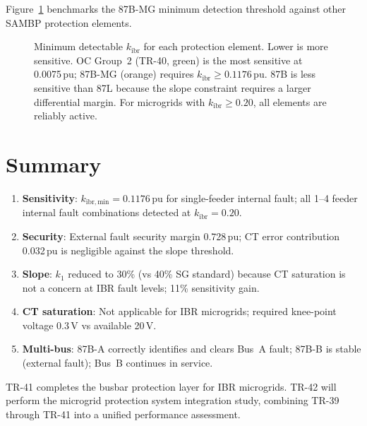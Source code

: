 \documentclass[11pt,a4paper]{article}
\begin{document}
Figure~\ref{fig:sensitivity} benchmarks the 87B-MG minimum detection threshold
against other SAMBP protection elements.

\begin{figure}[htbp]
  \centering
  \resizebox{0.88\textwidth}{!}{}
  \caption{Minimum detectable $k_\mathrm{ibr}$ for each protection element.
           Lower is more sensitive.  OC Group~2 (TR-40, green) is the
           most sensitive at 0.0075\,pu; 87B-MG (orange) requires
           $k_\mathrm{ibr}\geq0.1176$\,pu.  87B is less sensitive than 87L
           because the slope constraint requires a larger differential
           margin.  For microgrids with $k_\mathrm{ibr}\geq0.20$, all
           elements are reliably active.}
  \label{fig:sensitivity}
\end{figure}

\section{Summary}
\label{sec:summary}

\begin{enumerate}
  \item \textbf{Sensitivity}: $k_\mathrm{ibr,min}=0.1176$\,pu for single-feeder
    internal fault; all 1--4 feeder internal fault combinations detected at
    $k_\mathrm{ibr}=0.20$.

  \item \textbf{Security}: External fault security margin 0.728\,pu; CT
    error contribution 0.032\,pu is negligible against the slope threshold.

  \item \textbf{Slope}: $k_1$ reduced to 30\% (vs 40\% SG standard) because
    CT saturation is not a concern at IBR fault levels; 11\% sensitivity gain.

  \item \textbf{CT saturation}: Not applicable for IBR microgrids; required
    knee-point voltage 0.3\,V vs available 20\,V.

  \item \textbf{Multi-bus}: 87B-A correctly identifies and clears Bus~A fault;
    87B-B is stable (external fault); Bus~B continues in service.
\end{enumerate}

\noindent
TR-41 completes the busbar protection layer for IBR microgrids.  TR-42 will
perform the microgrid protection system integration study, combining TR-39
through TR-41 into a unified performance assessment.



\end{document}
